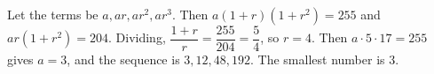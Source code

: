 Let the terms be $a,ar,ar^2,ar^3$. Then $a(1+r)(1+r^2)=255$ and $ar(1+r^2)=204$. Dividing, $\dfrac{1+r}r=\dfrac{255}{204}=\dfrac54$, so $r=4$. Then $a\cdot5\cdot17=255$ gives $a=3$, and the sequence is $3,12,48,192$. The smallest number is $\boxed{3}$.
